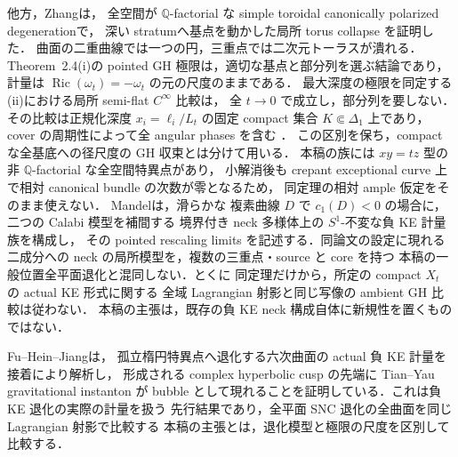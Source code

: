 他方，Zhang\cite[Theorems~1.1, 2.4]{ZhangNegativeKE}は，
全空間が $\mathbb Q$-factorial な simple toroidal canonically polarized degenerationで，
深い stratumへ基点を動かした局所 torus collapse を証明した．
曲面の二重曲線では一つの円，三重点では二次元トーラスが潰れる．
Theorem~2.4(i)の pointed GH 極限は，適切な基点と部分列を選ぶ結論であり，
計量は $\operatorname{Ric}(\omega_t)=-\omega_t$ の元の尺度のままである．
最大深度の極限を同定する(ii)における局所 semi-flat $C^\infty$ 比較は，
全 $t\to0$ で成立し，部分列を要しない．
その比較は正規化深度 $x_i=\ell_i/L_t$ の固定 compact 集合
$K\Subset\Delta_1$ 上であり，cover の周期性によって全 angular phases を含む
\cite[Lemmas~3.2, 3.3, 3.5; Proposition~3.4]{ZhangNegativeKE}．
この区別を保ち，compact な全基底への径尺度の GH 収束とは分けて用いる．
本稿の族には $xy=tz$ 型の非 $\mathbb Q$-factorial な全空間特異点があり，
小解消後も crepant exceptional curve 上で相対 canonical bundle の次数が零となるため，
同定理の相対 ample 仮定をそのまま使えない．
Mandel\cite[Theorems~1.1--1.2]{MandelNegativeKE}は，滑らかな
複素曲線 $D$ で $c_1(D)<0$ の場合に，二つの Calabi 模型を補間する
境界付き neck 多様体上の $S^1$-不変な負 KE 計量族を構成し，
その pointed rescaling limits を記述する．同論文の設定に現れる
二成分への neck の局所模型を，複数の三重点・source と core を持つ
本稿の一般位置全平面退化と混同しない．とくに
同定理だけから，所定の compact $X_t$ の actual KE 形式に関する
全域 Lagrangian 射影と同じ写像の ambient GH 比較は従わない．
本稿の主張は，既存の負 KE neck 構成自体に新規性を置くものではない．

Fu--Hein--Jiang\cite[\S1.1, Main Theorem]{FuHeinJiangCusp}は，
孤立楕円特異点へ退化する六次曲面の actual 負 KE 計量を接着により解析し，
形成される complex hyperbolic cusp の先端に Tian--Yau gravitational instanton が
bubble として現れることを証明している．これは負 KE 退化の実際の計量を扱う
先行結果であり，全平面 SNC 退化の全曲面を同じ Lagrangian 射影で比較する
本稿の主張とは，退化模型と極限の尺度を区別して比較する．

